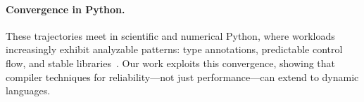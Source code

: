 \paragraph{Convergence in Python.}
These trajectories meet in scientific and numerical Python, where workloads increasingly exhibit analyzable patterns: type annotations, predictable control flow, and stable libraries~\cite{bence2021unambiguity,PEP484}. Our work exploits this convergence, showing that compiler techniques for reliability---not just performance---can extend to dynamic languages.
